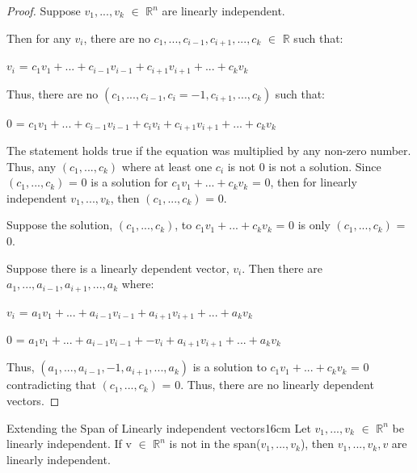     \begin{proof}
        Suppose  $v_1,...,v_k$ $\in$ $\mathbb{R}^n$ are linearly independent.

        Then for any $v_i$, there are no $c_1,...,c_{i-1},c_{i+1},...,c_k$
        $\in$ $\mathbb{R}$ such that:

        \hspace{0.5cm}
        $v_i$ = $c_1v_1 + ... + c_{i-1}v_{i-1} + c_{i+1}v_{i+1} + ... + c_kv_k$

        Thus, there are no $(c_1,...,c_{i-1},c_i=-1,c_{i+1},...,c_k)$
        such that:

        \hspace{0.5cm}
        0 = $c_1v_1 + ... + c_{i-1}v_{i-1} + c_iv_i + c_{i+1}v_{i+1} + ... + c_kv_k$

        The statement holds true if the equation was multiplied by any
        non-zero number. Thus, any $(c_1,...,c_k)$ where at least one
        $c_i$ is not 0 is not a solution.
        Since $(c_1,...,c_k)$ = 0 is a solution for $c_1v_1 + ... + c_kv_k$ = 0,
        then for linearly independent $v_1,...,v_k$, then $(c_1,...,c_k)$ = 0.

        \vspace{0.2cm}

        Suppose the solution, $(c_1,...,c_k)$, to
        $c_1v_1 + ... + c_kv_k$ = 0 is only $(c_1,...,c_k)$ = 0.

        Suppose there is a linearly dependent vector, $v_i$.
        Then there are $a_1,...,a_{i-1},a_{i+1},...,a_k$ where:

        \hspace{0.5cm}
        $v_i$ = $a_1v_1 + ... + a_{i-1}v_{i-1} + a_{i+1}v_{i+1} + ... + a_kv_k$

        \hspace{0.5cm}
        0 = $a_1v_1 + ... + a_{i-1}v_{i-1} + -v_i + a_{i+1}v_{i+1} + ... + a_kv_k$

        Thus, $(a_1,...,a_{i-1},-1,a_{i+1},...,a_k)$ is
        a solution to $c_1v_1 + ... + c_kv_k$ = 0
        contradicting that $(c_1,...,c_k)$ = 0.
        Thus, there are no linearly dependent vectors.
    \end{proof}

    \vspace{0.5cm}



    \begin{wtheorem}{Extending the Span of Linearly independent vectors}{16cm}
        Let $v_1,...,v_k$ $\in$ $\mathbb{R}^n$ be linearly independent.
        If v $\in$ $\mathbb{R}^n$ is not in the span($v_1,...,v_k$), then
        $v_1,...,v_k,v$ are linearly independent.
    \end{wtheorem}

